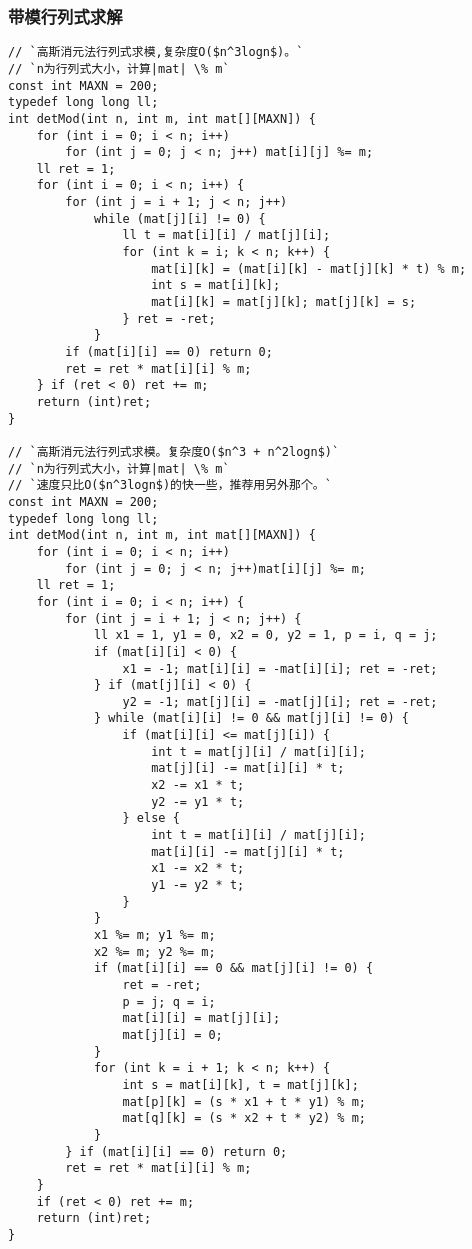 \subsubsection{带模行列式求解}
\begin{lstlisting}
// `高斯消元法行列式求模,复杂度O($n^3logn$)。`
// `n为行列式大小，计算|mat| \% m`
const int MAXN = 200;
typedef long long ll;
int detMod(int n, int m, int mat[][MAXN]) {
    for (int i = 0; i < n; i++)
        for (int j = 0; j < n; j++) mat[i][j] %= m;
    ll ret = 1;
    for (int i = 0; i < n; i++) {
        for (int j = i + 1; j < n; j++)
            while (mat[j][i] != 0) {
                ll t = mat[i][i] / mat[j][i];
                for (int k = i; k < n; k++) {
                    mat[i][k] = (mat[i][k] - mat[j][k] * t) % m;
                    int s = mat[i][k];
                    mat[i][k] = mat[j][k]; mat[j][k] = s;
                } ret = -ret;
            }
        if (mat[i][i] == 0) return 0;
        ret = ret * mat[i][i] % m;
    } if (ret < 0) ret += m;
    return (int)ret;
}

// `高斯消元法行列式求模。复杂度O($n^3 + n^2logn$)`
// `n为行列式大小，计算|mat| \% m`
// `速度只比O($n^3logn$)的快一些，推荐用另外那个。`
const int MAXN = 200;
typedef long long ll;
int detMod(int n, int m, int mat[][MAXN]) {
    for (int i = 0; i < n; i++)
        for (int j = 0; j < n; j++)mat[i][j] %= m;
    ll ret = 1;
    for (int i = 0; i < n; i++) {
        for (int j = i + 1; j < n; j++) {
            ll x1 = 1, y1 = 0, x2 = 0, y2 = 1, p = i, q = j;
            if (mat[i][i] < 0) {
                x1 = -1; mat[i][i] = -mat[i][i]; ret = -ret;
            } if (mat[j][i] < 0) {
                y2 = -1; mat[j][i] = -mat[j][i]; ret = -ret;
            } while (mat[i][i] != 0 && mat[j][i] != 0) {
                if (mat[i][i] <= mat[j][i]) {
                    int t = mat[j][i] / mat[i][i];
                    mat[j][i] -= mat[i][i] * t;
                    x2 -= x1 * t;
                    y2 -= y1 * t;
                } else {
                    int t = mat[i][i] / mat[j][i];
                    mat[i][i] -= mat[j][i] * t;
                    x1 -= x2 * t;
                    y1 -= y2 * t;
                }
            }
            x1 %= m; y1 %= m;
            x2 %= m; y2 %= m;
            if (mat[i][i] == 0 && mat[j][i] != 0) {
                ret = -ret;
                p = j; q = i;
                mat[i][i] = mat[j][i];
                mat[j][i] = 0;
            }
            for (int k = i + 1; k < n; k++) {
                int s = mat[i][k], t = mat[j][k];
                mat[p][k] = (s * x1 + t * y1) % m;
                mat[q][k] = (s * x2 + t * y2) % m;
            }
        } if (mat[i][i] == 0) return 0;
        ret = ret * mat[i][i] % m;
    }
    if (ret < 0) ret += m;
    return (int)ret;
}
\end{lstlisting}


